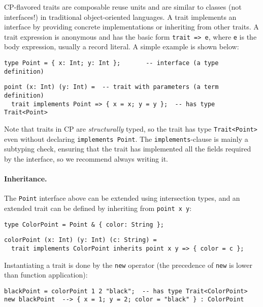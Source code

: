 CP-flavored traits are composable reuse units and are similar to classes (not
interfaces!) in traditional object-oriented languages. A trait implements an
interface by providing concrete implementations or inheriting from other traits.
A trait expression is anonymous and has the basic form \lstinline{trait => e},
where \lstinline{e} is the body expression, usually a record literal. A simple
example is shown below:
\begin{lstlisting}
type Point = { x: Int; y: Int };       -- interface (a type definition)
\end{lstlisting}
\vspace{-1ex}
\begin{lstlisting}
point (x: Int) (y: Int) =  -- trait with parameters (a term definition)
  trait implements Point => { x = x; y = y };  -- has type Trait<Point>
\end{lstlisting}
Note that traits in CP are \emph{structurally} typed, so the trait has type
\lstinline{Trait<Point>} even without declaring \lstinline{implements Point}.
The \lstinline{implements}-clause is mainly a subtyping check, ensuring that the
trait has implemented all the fields required by the interface, so we recommend
always writing it.

\paragraph{Inheritance.}
The \lstinline{Point} interface above can be extended using intersection types,
and an extended trait can be defined by inheriting from \lstinline{point x y}:
\begin{lstlisting}
type ColorPoint = Point & { color: String };
\end{lstlisting}
\vspace{-1ex}
\begin{lstlisting}
colorPoint (x: Int) (y: Int) (c: String) =
  trait implements ColorPoint inherits point x y => { color = c };
\end{lstlisting}
Instantiating a trait is done by the \lstinline{new} operator (the precedence of
\lstinline{new} is lower than function application):
\begin{lstlisting}
blackPoint = colorPoint 1 2 "black";  -- has type Trait<ColorPoint>
new blackPoint  --> { x = 1; y = 2; color = "black" } : ColorPoint
\end{lstlisting}

